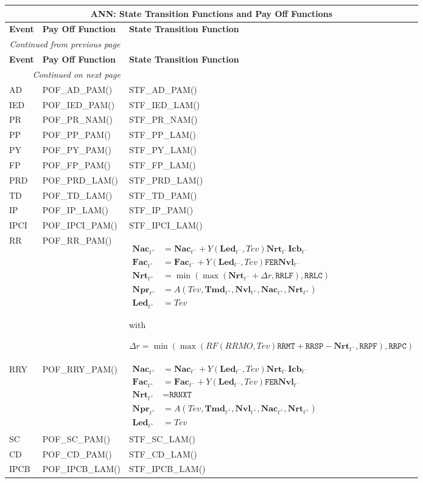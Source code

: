 \documentclass[9pt,oneside]{amsart}
\newenvironment{functions}[1]{
    	\begin{longtable}[H]{| p{0.05\textwidth} | p{0.42\textwidth} |  p{0.48\textwidth} |}
	\multicolumn{3}{c}{\textbf{#1: State Transition Functions and Pay Off Functions}}\\
	\hline
	\textbf{Event} & \textbf{Pay Off Function} & \textbf{State Transition Function}\\
	\hline
	\endfirsthead
	\multicolumn{2}{c}{\textit{Continued from previous page}} \\
	\hline
	\textbf{Event} & \textbf{Pay Off Function} & \textbf{State Transition Function}\\
	\hline
	\endhead
	\hline \multicolumn{2}{r}{\textit{Continued on next page}} \\
	\endfoot
	\hline
	\endlastfoot
}{%
    	\end{longtable}
}
\newcommand{\svar}[2]{\textbf{#1}_{#2}}
\newcommand{\attr}[1]{\texttt{#1}}
\newcommand{\stf}[2]{STF\_#1\_#2()}
\newcommand{\pof}[2]{POF\_#1\_#2()}
\newcommand{\yfr}[2]{Y(#1,#2)}
\newcommand{\ann}[5]{A(#1,#2,#3,#4,#5)}
\begin{document}





\begin{functions}{ANN}
	AD & \pof{AD}{PAM} & \stf{AD}{PAM} \\
	\hline
	IED & \pof{IED}{PAM} & \stf{IED}{LAM} \\ 
	\hline
	PR & \pof{PR}{NAM} & \stf{PR}{NAM} \\
	\hline
	PP & \pof{PP}{PAM}
		& \stf{PP}{LAM} \\
	\hline
	PY & \pof{PY}{PAM}
		& \stf{PY}{LAM} \\
	\hline
	FP & \pof{FP}{PAM}
		& \stf{FP}{LAM} \\
	\hline 
  	PRD & \pof{PRD}{LAM}
		& \stf{PRD}{LAM} \\
	\hline
  	TD & \pof{TD}{LAM}
		& \stf{TD}{PAM} \\
	\hline
	IP & \pof{IP}{LAM}
		& \stf{IP}{PAM} \\
	\hline
	IPCI & \pof{IPCI}{PAM}
		& \stf{IPCI}{LAM} \\
	\hline
	RR & \pof{RR}{PAM}
		& {$\begin{aligned} 
			\svar{Nac}{t^+} &= \svar{Nac}{t^-} + \yfr{\svar{Led}{t^-}}{Tev}\svar{Nrt}{t^-}\svar{Icb}{t^-} \\
			\svar{Fac}{t^+} &= \svar{Fac}{t^-} + \yfr{\svar{Led}{t^-}}{Tev}\attr{FER}\svar{Nvl}{t^-} \\
			\svar{Nrt}{t^+} &= \min(\max(\svar{Nrt}{t^-}+\Delta r,\attr{RRLF}),\attr{RRLC}) \\
			\svar{Npr}{t^+} &= \ann{Tev}{\svar{Tmd}{t^+}}{\svar{Nvl}{t^+}}{\svar{Nac}{t^+}}{\svar{Nrt}{t^+}} \\
			\svar{Led}{t^+} &= Tev \end{aligned}$}\par
		with\par
		$\Delta r = \min(\max(RF(RRMO, Tev)\attr{RRMT}+\attr{RRSP} - \svar{Nrt}{t^-},\attr{RRPF}),\attr{RRPC})$ \\
	\hline
	RRY & \pof{RRY}{PAM} 
		& {$\begin{aligned} 
			\svar{Nac}{t^+} &= \svar{Nac}{t^-} + \yfr{\svar{Led}{t^-}}{Tev}\svar{Nrt}{t^-}\svar{Icb}{t^-} \\
			\svar{Fac}{t^+} &= \svar{Fac}{t^-} + \yfr{\svar{Led}{t^-}}{Tev}\attr{FER}\svar{Nvl}{t^-} \\
			\svar{Nrt}{t^+} &= \attr{RRNXT} \\
			\svar{Npr}{t^+} &= \ann{Tev}{\svar{Tmd}{t^+}}{\svar{Nvl}{t^+}}{\svar{Nac}{t^+}}{\svar{Nrt}{t^+}} \\
			\svar{Led}{t^+} &= Tev \end{aligned}$} \\
	\hline
	SC & \pof{SC}{PAM}
		& \stf{SC}{LAM} \\
	\hline 
	CD & \pof{CD}{PAM}
		& \stf{CD}{LAM} \\
	\hline
	IPCB & \pof{IPCB}{LAM}
		& \stf{IPCB}{LAM} \\
  \hline
\end{functions}
\end{document}
